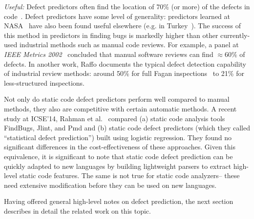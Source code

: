 {\em Useful:}
Defect predictors often  find the location of  70\% (or more)
of the defects in code~\cite{me07b}.
Defect predictors have some level of generality:
predictors learned at NASA~\cite{me07b} have also been found useful elsewhere
(e.g. in Turkey~\cite{tosun10,tosun09}).
The success of this method in  predictors in finding bugs is   markedly
higher than other currently-used
industrial
methods such as manual code reviews. For example, 
a  panel at {\em IEEE Metrics
2002}~\cite{shu02} concluded that manual software  reviews can find ${\approx}60\%$ 
of defects.
In another work, 
Raffo documents the typical    defect detection capability of
industrial review methods:   around 50\%
 for full Fagan inspections~\cite{fagan76} to
21\% for less-structured inspections.

Not only do static code defect predictors perform well compared to manual methods,
they also are competitive with certain automatic methods.
A recent study at ICSE'14, Rahman et al.~\cite{rahman14:icse} compared
(a) static code analysis tools FindBugs, Jlint, and Pmd and (b)
static code defect predictors
(which they called ``statistical defect prediction'') built using logistic regression.
They found  no significant differences in the cost-effectiveness
of these  approaches. Given this equivalence, it is significant to note that 
static code defect prediction can be quickly adapted to new languages by building lightweight
parsers to extract high-level static code features. The same is not true for   static code analyzers-- these need  extensive modification before they can be used on new
languages.

Having offered general high-level notes on defect prediction,
the next section describes in detail the related work on this topic.
